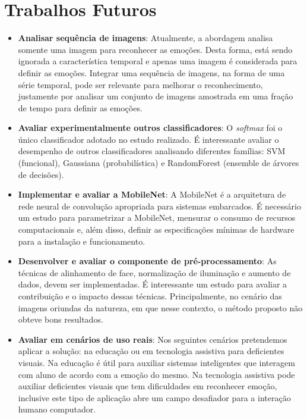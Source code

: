\section{Trabalhos Futuros}
\begin{itemize}
 \item \textbf{Analisar sequência de imagens}: Atualmente, a abordagem analisa somente uma imagem para reconhecer as emoções. Desta forma, está sendo ignorada a característica temporal e apenas uma imagem é considerada para definir as emoções. Integrar uma sequência de imagens, na forma de uma série temporal, pode ser relevante para melhorar o reconhecimento, justamente por analisar um conjunto de imagens amostrada em uma fração de tempo para definir as emoções. 
 \item \textbf{Avaliar experimentalmente outros classificadores}: O \textit{softmax} foi o único classificador adotado no estudo realizado. É interessante avaliar o desempenho de outros classificadores analisando diferentes famílias:  SVM (funcional), Gaussiana (probabilística) e RandomForest (ensemble de árvores de decisões).
 \item \textbf{Implementar e avaliar a MobileNet}: A MobileNet é a arquitetura de rede neural de convolução apropriada para sistemas embarcados. É necessário um estudo para parametrizar a MobileNet, mensurar o consumo de recursos computacionais e, além disso, definir as especificações mínimas de hardware para a instalação e funcionamento.  
 \item \textbf{Desenvolver e avaliar o componente de pré-processamento}: As técnicas de alinhamento de face, normalização de iluminação e aumento de dados, devem ser implementadas. É interessante um estudo para avaliar a contribuição e o impacto dessas técnicas. Principalmente, no cenário das imagens oriundas da natureza, em que nesse contexto, o método proposto não obteve bons resultados.
 \item \textbf{Avaliar em cenários de uso reais}: Nos seguintes cenários pretendemos aplicar a solução: na educação ou em tecnologia assistiva para deficientes visuais. Na educação é útil para auxiliar sistemas inteligentes que interagem com aluno de acordo com a emoção do mesmo. Na tecnologia assistiva pode auxiliar deficientes visuais que tem dificuldades em reconhecer emoção, inclusive este tipo de aplicação abre um campo desafiador para a interação humano computador.
 
\end{itemize}


%

